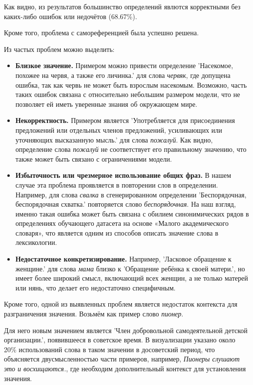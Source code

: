 \documentclass[LI,VKR]{HSEUniversity}
\begin{document}
Как видно, из результатов большинство определений явлются корректными
без каких-либо ошибок или недочётов (68.67\%).

Кроме того, проблема с самореференцией была успешно решена.

Из частых проблем можно выделить:
\begin{itemize}
    \item \textbf{Близкое значение.}
Примером можно привести определение ’Насекомое, похожее на червя, а также его личинка.’
для слова \textit{червяк},
где допущена ошибка, так как червь не может быть взрослым насекомым.
Возможно, часть таких ошибок связана с относительно небольшим размером модели,
что не позволяет ей иметь уверенные знания об окружающем мире.

    \item \textbf{Некорректность.}
Примером является ’Употребляется для присоединения предложений или отдельных членов предложений,
усиливающих или уточняющих высказанную мысль.’
для слова \textit{пожалуй}.
Как видно, определение слова \textit{пожалуй} не соответствует его правильному значению,
что также может быть связано с ограничениями модели.

    \item \textbf{Избыточность или чрезмерное использование общих фраз.}
В нашем случае эта проблема проявляется в повторении слов в определении.
Например, для слова \textit{свалка} в сгенерированном определении ’Беспорядочная, беспорядочная схватка.’
повторяется слово \textit{беспорядочная}.
На наш взгляд, именно такая ошибка может быть связана с обилием синонимических рядов в определениях
обучающего датасета на основе «Малого академического словаря»,
что является одним из способов описать значение слова в лексикологии.

    \item \textbf{Недостаточное конкретизирование.}
Например, ’Ласковое обращение к женщине.’ для слова \textit{мама} близко к
’Обращение ребёнка к своей матери.’, но имеет более широкий смысл, включающий всех женщин,
а не только матерей или нянь, что делает его недостаточно специфичным. %
\end{itemize}

Кроме того, одной из выявленных проблем является недостаток контекста для разграничения значения.
Возьмём как пример слово \textit{пионер}.

Для него новым значением является ’Член добровольной самодеятельной детской организации.’,
появившееся в советское время.
В визуализации указано около 20\% использований слова в таком значении
в досоветский период, что объясняется двусмысленностью части примеров,
например, \textit{Пионеры слушают это и восхищаются.}, где необходим дополнительный контекст
для установления значения.
\end{document}
